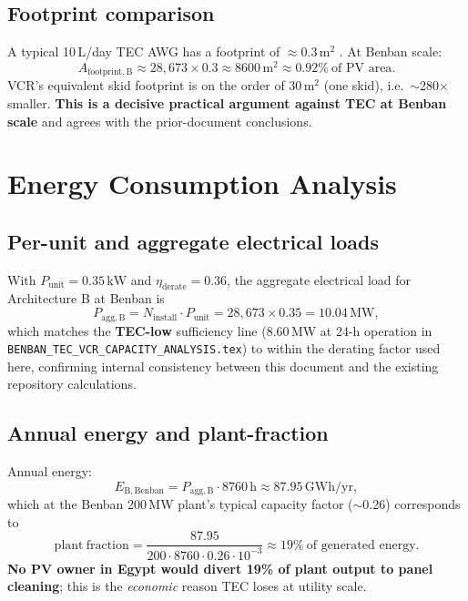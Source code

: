 \documentclass[11pt,a4paper]{article}
\newcommand{\SI}[2]{#1\,\ensuremath{\mathrm{#2}}}
\providecommand{\kilowatt}{kW}
\providecommand{\hour}{h}
\providecommand{\year}{yr}
\begin{document}
\subsection{Footprint comparison}
A typical 10\,L/day TEC AWG has a footprint of $\approx 0.3\,\mathrm{m^2}$ \citep{ecoloblue2024,commercial_awg_retail_2025}. At Benban scale:
\begin{equation}
A_{\mathrm{footprint,B}} \approx 28{,}673 \times 0.3 \approx 8600\,\mathrm{m^2} \approx 0.92\%\ \text{of PV area}.
\end{equation}
VCR's equivalent skid footprint is on the order of $30\,\mathrm{m^2}$ (one skid), i.e.\ $\sim$280$\times$ smaller. \textbf{This is a decisive practical argument against TEC at Benban scale} and agrees with the prior-document conclusions.

\section{Energy Consumption Analysis}
\label{sec:energy}

\subsection{Per-unit and aggregate electrical loads}
With $P_{\mathrm{unit}}{=}\SI{0.35}{\kilowatt}$ and $\eta_{\mathrm{derate}}{=}0.36$, the aggregate electrical load for Architecture B at Benban is
\begin{equation}
P_{\mathrm{agg,B}} = N_{\mathrm{install}}\cdot P_{\mathrm{unit}}
= 28{,}673 \times 0.35 = \SI{10.04}{MW},
\end{equation}
which matches the \textbf{TEC-low} sufficiency line (8.60\,MW at 24-h operation in \texttt{BENBAN\_TEC\_VCR\_CAPACITY\_ANALYSIS.tex}) to within the derating factor used here, confirming internal consistency between this document and the existing repository calculations.

\subsection{Annual energy and plant-fraction}
Annual energy:
\begin{equation}
E_{\mathrm{B,Benban}} = P_{\mathrm{agg,B}}\cdot \SI{8760}{\hour} \approx \SI{87.95}{GWh/\year},
\end{equation}
which at the Benban 200\,MW plant's typical capacity factor ($\sim$0.26) corresponds to
\begin{equation}
\mathrm{plant\ fraction} = \frac{87.95}{200\cdot 8760\cdot 0.26\cdot 10^{-3}} \approx 19\%
\ \text{of generated energy.}
\end{equation}
\textbf{No PV owner in Egypt would divert 19\% of plant output to panel cleaning}; this is the \emph{economic} reason TEC loses at utility scale.
\end{document}
